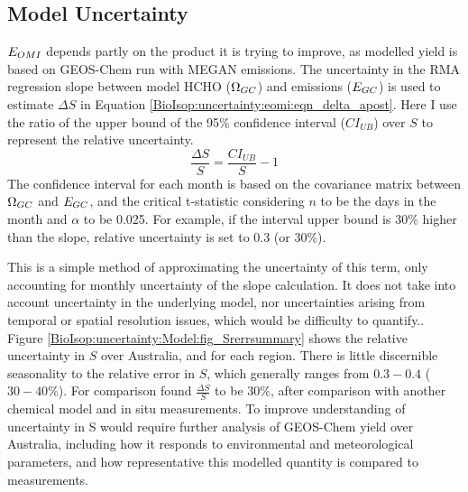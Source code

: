     
    
    
  \subsection{Model Uncertainty}
    \label{BioIsop:uncertainty:Model}
    
    $E_{OMI}$ depends partly on the product it is trying to improve, as modelled yield is based on GEOS-Chem run with MEGAN emissions.
    The uncertainty in the RMA regression slope between model HCHO ($\Omega_{GC}$) and emissions ($E_{GC}$) is used to estimate $\Delta S$ in Equation \ref{BioIsop:uncertainty:eomi:eqn_delta_apost}.
    Here I use the ratio of the upper bound of the 95\% confidence interval ($CI_{UB}$) over $S$ to represent the relative uncertainty.
    \begin{equation}
      \frac{\Delta S}{S} = \frac{CI_{UB}}{S} - 1
    \end{equation}
    The confidence interval for each month is based on the covariance matrix between $\Omega_{GC}$ and $E_{GC}$, and the critical t-statistic considering $n$ to be the days in the month and $\alpha$ to be 0.025.
    For example, if the interval upper bound is 30\% higher than the slope, relative uncertainty is set to 0.3 (or 30\%).
    
    This is a simple method of approximating the uncertainty of this term, only accounting for monthly uncertainty of the slope calculation.
    It does not take into account uncertainty in the underlying model, nor uncertainties arising from temporal or spatial resolution issues, which would be difficulty to quantify..
    Figure \ref{BioIsop:uncertainty:Model:fig_Srerrsummary} shows the relative uncertainty in $S$ over Australia, and for each region.
    There is little discernible seasonality to the relative error in $S$, which generally ranges from $0.3-0.4$ ($30-40\%$).
    For comparison \textcite{Palmer2006} found $\frac{\Delta S}{S}$ to be 30\%, after comparison with another chemical model and in situ measurements.
    To improve understanding of uncertainty in S would require further analysis of GEOS-Chem yield over Australia, including how it responds to environmental and meteorological parameters, and how representative this modelled quantity is compared to measurements.
    
